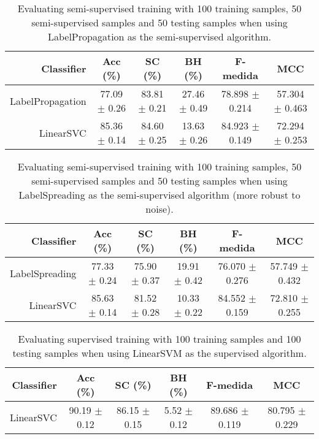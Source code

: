 \begin{table}[!htb]
\footnotesize
\centering
\caption{Evaluating semi-supervised training with 100 training samples, 50 semi-supervised samples and 50 testing samples when using LabelPropagation as the semi-supervised algorithm.}
\label{tab:label-propagation}
\begin{tabular}{r|c|c|c|c|c} \hline\hline
Classifier & Acc (\%) & SC (\%) & BH (\%) & F-medida & MCC \\ \hline
LabelPropagation & 77.09 $\pm$ 0.26 & 83.81 $\pm$ 0.21 & 27.46 $\pm$ 0.49 & 78.898 $\pm$ 0.214 & 57.304 $\pm$ 0.463 \\
LinearSVC & 85.36 $\pm$ 0.14 & 84.60 $\pm$ 0.25 & 13.63 $\pm$ 0.26 & 84.923 $\pm$ 0.149 & 72.294 $\pm$ 0.253 \\
\hline\hline
\end{tabular}
\end{table}
\begin{table}[!htb]
\footnotesize
\centering
\caption{Evaluating semi-supervised training with 100 training samples, 50 semi-supervised samples and 50 testing samples when using LabelSpreading as the semi-supervised algorithm (more robust to noise).}
\label{tab:label-spreading}
\begin{tabular}{r|c|c|c|c|c} \hline\hline
Classifier & Acc (\%) & SC (\%) & BH (\%) & F-medida & MCC \\ \hline
LabelSpreading & 77.33 $\pm$ 0.24 & 75.90 $\pm$ 0.37 & 19.91 $\pm$ 0.42 & 76.070 $\pm$ 0.276 & 57.749 $\pm$ 0.432 \\
LinearSVC & 85.63 $\pm$ 0.14 & 81.52 $\pm$ 0.28 & 10.33 $\pm$ 0.22 & 84.552 $\pm$ 0.159 & 72.810 $\pm$ 0.255 \\
\hline\hline
\end{tabular}
\end{table}
\begin{table}[!htb]
\footnotesize
\centering
\caption{Evaluating supervised training with 100 training samples and 100 testing samples when using LinearSVM as the supervised algorithm.}
\label{tab:linear-svm}
\begin{tabular}{r|c|c|c|c|c} \hline\hline
Classifier & Acc (\%) & SC (\%) & BH (\%) & F-medida & MCC \\ \hline
LinearSVC & 90.19 $\pm$ 0.12 & 86.15 $\pm$ 0.15 & 5.52 $\pm$ 0.12 & 89.686 $\pm$ 0.119 & 80.795 $\pm$ 0.229 \\
\hline\hline
\end{tabular}
\end{table}
